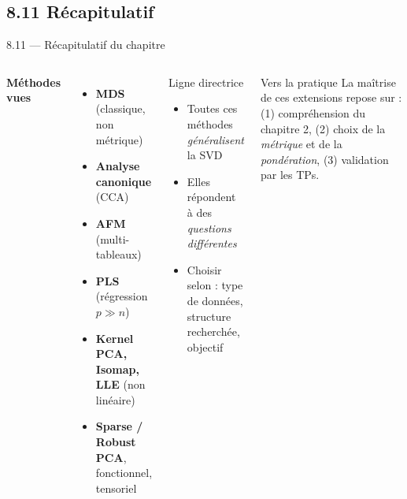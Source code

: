 \subsection{8.11 Récapitulatif}
\begin{frame}{8.11 — Récapitulatif du chapitre}
\begin{columns}[T]
\textbf{Méthodes vues}
\begin{itemize}\small
  \item \textbf{MDS} (classique, non métrique)
  \item \textbf{Analyse canonique} (CCA)
  \item \textbf{AFM} (multi-tableaux)
  \item \textbf{PLS} (régression $p \gg n$)
  \item \textbf{Kernel PCA, Isomap, LLE} (non linéaire)
  \item \textbf{Sparse / Robust PCA}, fonctionnel, tensoriel
\end{itemize}
\begin{block}{Ligne directrice}
\begin{itemize}\small
  \item Toutes ces méthodes \emph{généralisent} la SVD
  \item Elles répondent à des \emph{questions différentes}
  \item Choisir selon : type de données, structure recherchée, objectif
\end{itemize}
\end{block}

\begin{alertblock}{Vers la pratique}
\small La maîtrise de ces extensions repose sur : (1) compréhension du
chapitre 2, (2) choix de la \emph{métrique} et de la \emph{pondération},
(3) validation par les TPs.
\end{alertblock}
\end{columns}
\end{frame}


